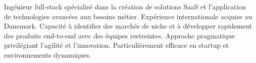 


\begin{cvparagraph}
Ingénieur full-stack spécialisé dans la création de solutions SaaS et l'application de technologies avancées aux besoins métier. Expérience internationale acquise au Danemark. Capacité à identifier des marchés de niche et à développer rapidement des produits end-to-end avec des équipes restreintes. Approche pragmatique privilégiant l'agilité et l'innovation. Particulièrement efficace en startup et environnements dynamiques.
\end{cvparagraph}
\vspace{1.5em}